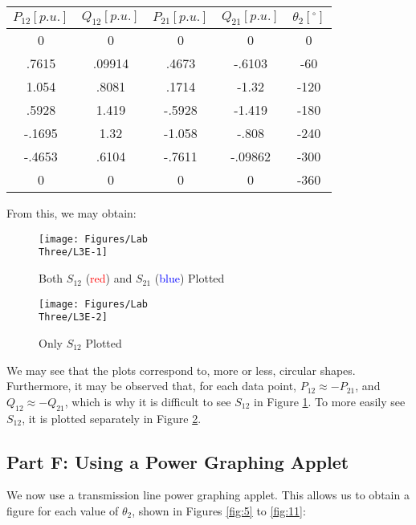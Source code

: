 \documentclass[
	letterpaper, %
	10pt, %
]{CSUniSchoolLabReport}
\begin{document}
\begin{center}
  \begin{tabular}[H]{|c|c|c|c|c|}
    \hline
    $P_{12}\left[ p.u. \right]$ & $Q_{12}\left[ p.u. \right]$ & $P_{21}\left[ p.u. \right]$ & $Q_{21}\left[ p.u. \right]$ & $\theta_2[^{\circ}]$\\
    \hline
    0 & 0 & 0 & 0 & 0\\
    \hline
    .7615 & .09914 & .4673 & -.6103 & -60\\
    \hline
    1.054 & .8081 & .1714 & -1.32 & -120\\
    \hline
    .5928 & 1.419 & -.5928 & -1.419 & -180\\
    \hline
    -.1695 & 1.32 & -1.058 & -.808 & -240\\
    \hline
    -.4653 & .6104 & -.7611 & -.09862 & -300\\
    \hline
    0 & 0 & 0 & 0 & -360\\
    \hline
  \end{tabular}
\end{center}

From this, we may obtain:

\begin{figure}[H]
  \centering
  \texttt{[image: Figures/Lab\\ Three/L3E-1]}
  \caption{Both $S_{12}$ (\textcolor{red}{red}) and $S_{21}$ (\textcolor{blue}{blue}) Plotted}
  \label{fig:3}
\end{figure}

\begin{figure}[H]
  \centering
  \texttt{[image: Figures/Lab\\ Three/L3E-2]}
  \caption{Only $S_{12}$ Plotted}
  \label{fig:4}
\end{figure}

We may see that the plots correspond to, more or less, circular shapes. Furthermore, it may be observed that, for each data point, $P_{12}\approx -P_{21}$, and $Q_{12}\approx -Q_{21}$, which is why it is difficult to see $S_{12}$ in Figure \ref{fig:3}. To more easily see $S_{12}$, it is plotted separately in Figure \ref{fig:4}.

\subsection{Part F: Using a Power Graphing Applet}

We now use a transmission line power graphing applet. This allows us to obtain a figure for each value of $\theta_2$, shown in Figures \ref{fig:5} to \ref{fig:11}:
\end{document}
